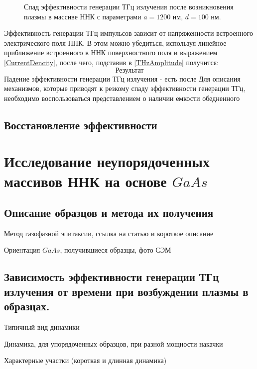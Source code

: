 \documentclass[a4paper,14pt,russian]{extreport}
\begin{document}
				\begin{figure}[H]
					\caption{Спад эффективности генерации ТГц излучения после возникновения плазмы в массиве ННК с параметрами $a = 1200 \text{ нм, } d = 100 \text{ нм}$.}
				\label{ris:short1200100}
				\end{figure}
				Эффективность генерации ТГц импульсов зависит от напряженности встроенного электрического поля ННК. В этом можно убедиться, используя линейное приближение встроенного в ННК поверхностного поля и выражением \ref{CurrentDencity}, после чего, подставив в \ref{THzAmplitude} получится:
				\begin{equation}
				\text{Результат}
				\end{equation}				 
				Падение эффективности генерации ТГц излучения - есть после
				Для описания механизмов, которые приводят к резкому спаду эффективности генерации ТГц, необходимо воспользоваться представлением о наличии емкости обедненного
			\subsection{Восстановление эффективности}
		\section{Исследование неупорядоченных массивов ННК на основе $GaAs$}
			\subsection{Описание образцов и метода их получения}
				Метод газофазной эпитаксии, ссылка на
				статью и короткое описание\par
				Ориентация $GaAs$, получившиеся образцы,
				фото СЭМ
			\newpage
			\subsection{Зависимость эффективности генерации ТГц излучения от времени при возбуждении плазмы в образцах.}
				Типичный вид динамики\par
				Динамика, для упорядоченных образцов,
				при разной мощности накачки\par
				Характерные участки (короткая и длинная
				динамика)\par
\end{document}
